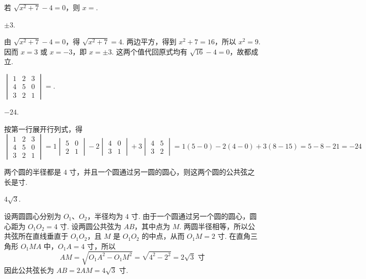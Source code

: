 \begin{problem}
若 \(\sqrt{x^{2}+7}-4=0\)，则 \(x=\)\fillinblank{}.
\end{problem}

\begin{answer}
\(\pm 3\).
\end{answer}

\begin{solution}
由 \(\sqrt{x^{2}+7}-4=0\)，得 \(\sqrt{x^{2}+7}=4\). 两边平方，得到 \(x^{2}+7=16\)，所以 \(x^{2}=9\). 因而 \(x=3\) 或 \(x=-3\)，即 \(x=\pm3\). 这两个值代回原式均有 \(\sqrt{16}-4=0\)，故都成立.
\end{solution}

\begin{problem}
\(\begin{vmatrix}1 & 2 & 3 \\ 4 & 5 & 0 \\ 3 & 2 & 1\end{vmatrix}=\)\fillinblank{}.
\end{problem}

\begin{answer}
\(-24\).
\end{answer}

\begin{solution}
按第一行展开行列式，得
\[
\begin{vmatrix}1&2&3\\4&5&0\\3&2&1\end{vmatrix}=1\begin{vmatrix}5&0\\2&1\end{vmatrix}-2\begin{vmatrix}4&0\\3&1\end{vmatrix}+3\begin{vmatrix}4&5\\3&2\end{vmatrix}=1(5-0)-2(4-0)+3(8-15)=5-8-21=-24
\]
\end{solution}

\begin{problem}
两个圆的半径都是 \(4\text{ 寸}\)，并且一个圆通过另一圆的圆心，则这两个圆的公共弦之长是\fillinblank{}\(\text{寸}\).
\end{problem}

\begin{answer}
\(4\sqrt{3}\).
\end{answer}

\begin{solution}
设两圆圆心分别为 \(O_{1}\)、\(O_{2}\)，半径均为 \(4\text{ 寸}\). 由于一个圆通过另一个圆的圆心，圆心距为 \(O_{1}O_{2}=4\text{ 寸}\). 设两圆公共弦为 \(AB\)，其中点为 \(M\). 两圆半径相等，所以公共弦所在直线垂直于 \(O_{1}O_{2}\)，且 \(M\) 是 \(O_{1}O_{2}\) 的中点，从而 \(O_{1}M=2\text{ 寸}\). 在直角三角形 \(O_{1}MA\) 中，\(O_{1}A=4\text{ 寸}\)，所以
\[
AM=\sqrt{O_{1}A^{2}-O_{1}M^{2}}=\sqrt{4^{2}-2^{2}}=2\sqrt3\text{ 寸}
\]
因此公共弦长为 \(AB=2AM=4\sqrt3\text{ 寸}\).
\end{solution}

